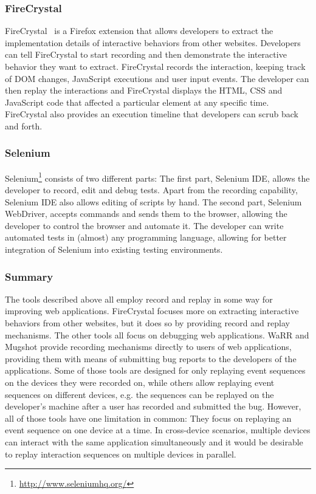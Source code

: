 \subsubsection{FireCrystal}

FireCrystal~\cite{firecrystal2009} is a Firefox extension that allows developers to extract the implementation details of interactive behaviors from other websites. Developers can tell FireCrystal to start recording and then demonstrate the interactive behavior they want to extract. FireCrystal records the interaction, keeping track of DOM changes, JavaScript executions and user input events. The developer can then replay the interactions and FireCrystal displays the HTML, CSS and JavaScript code that affected a particular element at any specific time. FireCrystal also provides an execution timeline that developers can scrub back and forth.

\subsubsection{Selenium}

Selenium\footnote{\url{http://www.seleniumhq.org/}} consists of two different parts: The first part, Selenium IDE, allows the developer to record, edit and debug tests. Apart from the recording capability, Selenium IDE also allows editing of scripts by hand. The second part, Selenium WebDriver, accepts commands and sends them to the browser, allowing the developer to control the browser and automate it. The developer can write automated tests in (almost) any programming language, allowing for better integration of Selenium into existing testing environments.

\subsubsection{Summary}

The tools described above all employ record and replay in some way for improving web applications. FireCrystal focuses more on extracting interactive behaviors from other websites, but it does so by providing record and replay mechanisms. The other tools all focus on debugging web applications. WaRR and Mugshot provide recording mechanisms directly to users of web applications, providing them with means of submitting bug reports to the developers of the applications. Some of those tools are designed for only replaying event sequences on the devices they were recorded on, while others allow replaying event sequences on different devices, e.g. the sequences can be replayed on the developer's machine after a user has recorded and submitted the bug. However, all of those tools have one limitation in common: They focus on replaying an event sequence on one device at a time. In cross-device scenarios, multiple devices can interact with the same application simultaneously and it would be desirable to replay interaction sequences on multiple devices in parallel.

